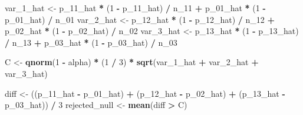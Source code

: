 \documentclass[
]{article}
\newenvironment{Shaded}{\begin{snugshade}}{\end{snugshade}}
\newcommand{\DecValTok}[1]{\textcolor[rgb]{0.00,0.00,0.81}{#1}}
\newcommand{\KeywordTok}[1]{\textcolor[rgb]{0.13,0.29,0.53}{\textbf{#1}}}
\newcommand{\NormalTok}[1]{#1}
\newcommand{\OperatorTok}[1]{\textcolor[rgb]{0.81,0.36,0.00}{\textbf{#1}}}
\newcommand{\StringTok}[1]{\textcolor[rgb]{0.31,0.60,0.02}{#1}}
\begin{document}
\begin{Shaded}
\begin{Highlighting}[]
\NormalTok{var_}\DecValTok{1}\NormalTok{_hat <-}\StringTok{ }\NormalTok{p_}\DecValTok{11}\NormalTok{_hat }\OperatorTok{*}\StringTok{ }\NormalTok{(}\DecValTok{1} \OperatorTok{-}\StringTok{ }\NormalTok{p_}\DecValTok{11}\NormalTok{_hat) }\OperatorTok{/}\StringTok{ }\NormalTok{n_}\DecValTok{11} \OperatorTok{+}\StringTok{ }\NormalTok{p_}\DecValTok{01}\NormalTok{_hat }\OperatorTok{*}\StringTok{ }\NormalTok{(}\DecValTok{1} \OperatorTok{-}\StringTok{ }\NormalTok{p_}\DecValTok{01}\NormalTok{_hat) }\OperatorTok{/}\StringTok{ }\NormalTok{n_}\DecValTok{01}
\NormalTok{var_}\DecValTok{2}\NormalTok{_hat <-}\StringTok{ }\NormalTok{p_}\DecValTok{12}\NormalTok{_hat }\OperatorTok{*}\StringTok{ }\NormalTok{(}\DecValTok{1} \OperatorTok{-}\StringTok{ }\NormalTok{p_}\DecValTok{12}\NormalTok{_hat) }\OperatorTok{/}\StringTok{ }\NormalTok{n_}\DecValTok{12} \OperatorTok{+}\StringTok{ }\NormalTok{p_}\DecValTok{02}\NormalTok{_hat }\OperatorTok{*}\StringTok{ }\NormalTok{(}\DecValTok{1} \OperatorTok{-}\StringTok{ }\NormalTok{p_}\DecValTok{02}\NormalTok{_hat) }\OperatorTok{/}\StringTok{ }\NormalTok{n_}\DecValTok{02}
\NormalTok{var_}\DecValTok{3}\NormalTok{_hat <-}\StringTok{ }\NormalTok{p_}\DecValTok{13}\NormalTok{_hat }\OperatorTok{*}\StringTok{ }\NormalTok{(}\DecValTok{1} \OperatorTok{-}\StringTok{ }\NormalTok{p_}\DecValTok{13}\NormalTok{_hat) }\OperatorTok{/}\StringTok{ }\NormalTok{n_}\DecValTok{13} \OperatorTok{+}\StringTok{ }\NormalTok{p_}\DecValTok{03}\NormalTok{_hat }\OperatorTok{*}\StringTok{ }\NormalTok{(}\DecValTok{1} \OperatorTok{-}\StringTok{ }\NormalTok{p_}\DecValTok{03}\NormalTok{_hat) }\OperatorTok{/}\StringTok{ }\NormalTok{n_}\DecValTok{03}

\NormalTok{C <-}\StringTok{ }\KeywordTok{qnorm}\NormalTok{(}\DecValTok{1} \OperatorTok{-}\StringTok{ }\NormalTok{alpha) }\OperatorTok{*}\StringTok{ }\NormalTok{(}\DecValTok{1} \OperatorTok{/}\StringTok{ }\DecValTok{3}\NormalTok{) }\OperatorTok{*}\StringTok{ }\KeywordTok{sqrt}\NormalTok{(var_}\DecValTok{1}\NormalTok{_hat }\OperatorTok{+}\StringTok{ }\NormalTok{var_}\DecValTok{2}\NormalTok{_hat }\OperatorTok{+}\StringTok{ }\NormalTok{var_}\DecValTok{3}\NormalTok{_hat)}

\NormalTok{diff <-}\StringTok{ }\NormalTok{((p_}\DecValTok{11}\NormalTok{_hat }\OperatorTok{-}\StringTok{ }\NormalTok{p_}\DecValTok{01}\NormalTok{_hat) }\OperatorTok{+}\StringTok{ }\NormalTok{(p_}\DecValTok{12}\NormalTok{_hat }\OperatorTok{-}\StringTok{ }\NormalTok{p_}\DecValTok{02}\NormalTok{_hat) }\OperatorTok{+}\StringTok{ }\NormalTok{(p_}\DecValTok{13}\NormalTok{_hat }\OperatorTok{-}\StringTok{ }\NormalTok{p_}\DecValTok{03}\NormalTok{_hat)) }\OperatorTok{/}\StringTok{ }\DecValTok{3}
\NormalTok{rejected_null <-}\StringTok{ }\KeywordTok{mean}\NormalTok{(diff }\OperatorTok{>}\StringTok{ }\NormalTok{C)}
\end{Highlighting}
\end{Shaded}
\end{document}
